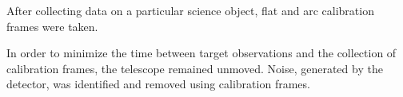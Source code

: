 After collecting data on a particular science object, flat and arc calibration frames were taken.  

In order to minimize the time between target observations and the collection of calibration frames, the telescope remained unmoved.  Noise, generated by the detector, was identified and removed using calibration frames.